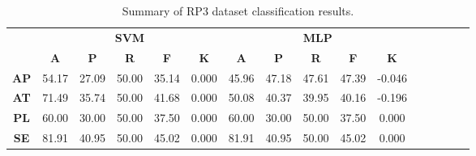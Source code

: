 \begin{landscape}
\begin{table}[htbp]
\footnotesize
\centering
\caption{Summary of RP3 dataset classification results.}
\label{tab:base_female}
\begin{tabular}{|c|c|c|c|c|c|c|c|c|c|c|c|c|c|c|c|}
\hline
\multirow{2}{*}{}	& \multicolumn{5}{c|}{\textbf{SVM}}												& \multicolumn{5}{c|}{\textbf{MLP}}												\\ \cline{2-11} 
					& \textbf{A}	& \textbf{P}	& \textbf{R}	& \textbf{F}	& \textbf{K}	& \textbf{A}	& \textbf{P}	& \textbf{R}	& \textbf{F}	& \textbf{K}	\\ \hline
\textbf{AP}			& 54.17			& 27.09			& 50.00			& 35.14			& 0.000			& 45.96			& 47.18			& 47.61			& 47.39			& -0.046			\\ \hline
\textbf{AT}			& 71.49			& 35.74			& 50.00			& 41.68			& 0.000			& 50.08			& 40.37			& 39.95			& 40.16			& -0.196			\\ \hline
\textbf{PL}			& 60.00			& 30.00			& 50.00			& 37.50			& 0.000			& 60.00			& 30.00			& 50.00			& 37.50			& 0.000			\\ \hline
\textbf{SE}			& 81.91			& 40.95			& 50.00			& 45.02			& 0.000			& 81.91			& 40.95			& 50.00			& 45.02			& 0.000			\\ \hline
\end{tabular}
\end{table}
\end{landscape}